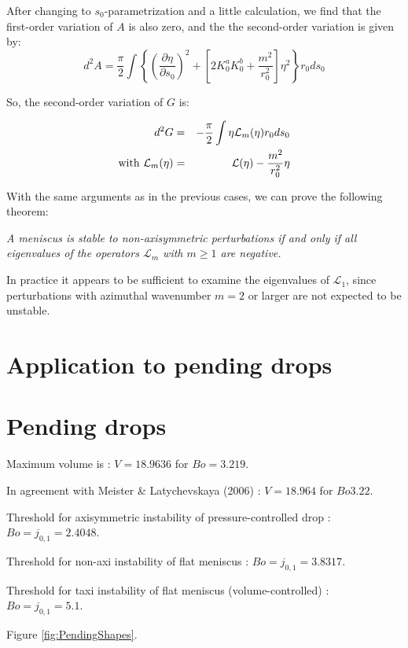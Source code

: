 \documentclass{jfm}
\let\ge=\geqslant  \let\geq=\geqslant
\newcommand\be{\begin{equation}}
\newcommand\ee{\end{equation}}
\newcommand\DP[2]{\frac{\partial #1}{\partial #2}}
\begin{document}
After changing to $s_0$-parametrization and a little calculation, we find that the first-order variation of $A$ is also zero, and the 
the second-order variation is given by:
\be
 d^2 A = \frac{\pi}{2}  \int  \left\{ \left( \DP{\eta}{s_0}\right)^2 + \left[ 2 K_0^a K_0^b + \frac{m^2}{r_0^2}  \right] \eta^2 \right\} r_0 d s_0 
\ee

So, the second-order variation of $G$ is:

\begin{eqnarray}
d^2 G &=& - \frac{\pi}{2} \int \eta {\cal L}_m (\eta)  r_0 d s_0 \\
  \mbox{with } 
{\mathcal L}_m(\eta) &=& \displaystyle {\mathcal L}(\eta) - \frac{m^2}{r_0^2}  \eta  
\end{eqnarray}


With the same arguments as in the previous cases, we can prove the following theorem:

{\em A meniscus is stable to non-axisymmetric perturbations if and only if all eigenvalues of the operators
${\mathcal L}_m$ with $m\ge1$ are negative. }

In practice it appears to be sufficient to examine the eigenvalues of ${\mathcal L}_1$, since perturbations with azimuthal wavenumber $m=2$ or larger are not expected to be unstable.






\section{Application to pending drops}



\section{Pending drops}

Maximum volume is :
$V = 18.9636$ for $Bo = 3.219$.


In agreement with Meister \& Latychevskaya (2006) : $V = 18.964$ for $Bo 3.22$.

Threshold for axisymmetric instability of pressure-controlled drop :
$Bo = j_{0,1} = 2.4048$.

Threshold for non-axi instability of flat meniscus : $Bo = j_{0,1} = 3.8317$.

Threshold for taxi instability of flat meniscus (volume-controlled) : $Bo = j_{0,1} = 5.1$.


Figure \ref{fig:PendingShapes}.
\end{document}
